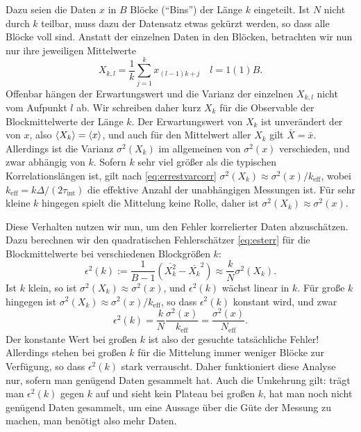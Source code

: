 Dazu seien die Daten $x$ in $B$ Blöcke (\enquote{Bins}) der Länge $k$
eingeteilt. Ist $N$ nicht durch $k$ teilbar, muss dazu der Datensatz
etwas gekürzt werden, so dass alle Blöcke voll sind. Anstatt der
einzelnen Daten in den Blöcken, betrachten wir nun nur ihre jeweiligen
Mittelwerte
\begin{equation}
  X_{k,l} = \frac{1}{k}\sum_{j=1}^{k}x_{(l-1)k + j}\quad l=1(1)B.
\end{equation}
Offenbar hängen der Erwartungswert und die Varianz der einzelnen
$X_{k,l}$ nicht vom Aufpunkt $l$ ab. Wir schreiben daher kurz $X_k$
für die Observable der Blockmittelwerte der Länge $k$.  Der
Erwartungswert von $X_k$ ist unverändert der von $x$, also $\left\langle{X_k}\right\rangle
= \left\langle{x}\right\rangle$, und auch für den Mittelwert aller $X_k$ gilt $\bar{X} =
\bar{x}$. Allerdings ist die Varianz $\sigma^2(X_{k})$ im allgemeinen
von $\sigma^2(x)$ verschieden, und zwar abhängig von $k$. Sofern $k$
sehr viel größer als die typischen Korrelationslängen ist, gilt nach
\eqref{eq:errestvarcorr} $\sigma^2(X_{k}) \approx
\sigma^2(x)/k_\text{eff}$, wobei $k_\text{eff} = k \Delta /
(2\tau_\text{int})$ die effektive Anzahl der unabhängigen Messungen
ist. Für sehr kleine $k$ hingegen spielt die Mittelung keine Rolle,
daher ist $\sigma^2(X_{k}) \approx \sigma^2(x)$.

Diese Verhalten nutzen wir nun, um den Fehler korrelierter Daten
abzuschätzen. Dazu berechnen wir den quadratischen Fehlerschätzer
\eqref{eq:esterr} für die Blockmittelwerte bei verschiedenen
Blockgrößen $k$:
\begin{equation}
  \epsilon^2(k) := \frac{1}{B - 1} \left(\overline{X_k^2} -
    \overline{X_k}^2\right) \approx \frac{k}{N} \sigma^2(X_k).
\end{equation}
Ist $k$ klein, so ist $\sigma^2(X_k)\approx \sigma^2(x)$, und
$\epsilon^2(k)$ wächst linear in $k$. Für große $k$ hingegen ist
$\sigma^2(X_k) \approx \sigma^2(x)/k_\text{eff}$, so dass
$\epsilon^2(k)$ konstant wird, und zwar
\begin{equation}
  \epsilon^2(k)= \frac{k}{N}\frac{\sigma^2(x)}{k_\text{eff}} =
  \frac{\sigma^2(x)}{N_\text{eff}}.
\end{equation}
Der konstante Wert bei großen $k$ ist also der gesuchte tatsächliche
Fehler!  Allerdings stehen bei großen $k$ für die Mittelung immer
weniger Blöcke zur Verfügung, so dass $\epsilon^2(k)$ stark
verrauscht. Daher funktioniert diese Analyse nur, sofern man genügend
Daten gesammelt hat. Auch die Umkehrung gilt: trägt man
$\epsilon^2(k)$ gegen $k$ auf und sieht kein Plateau bei großen $k$,
hat man noch nicht genügend Daten gesammelt, um eine Aussage über die
Güte der Messung zu machen, man benötigt also mehr Daten.

